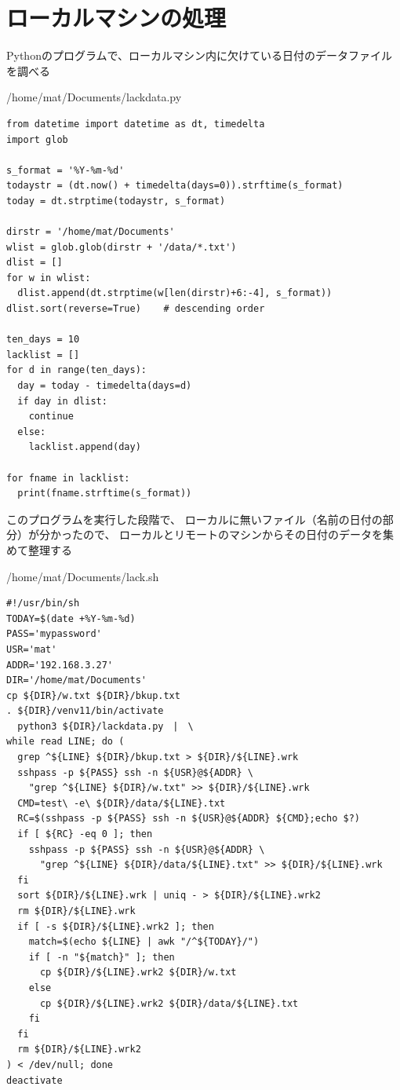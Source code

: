 \documentclass[12pt,a4j]{jsbook}
\begin{document}
\newpage

\section{ローカルマシンの処理}

Pythonのプログラムで、ローカルマシン内に欠けている日付のデータファイルを調べる

\begin{spacing}{0.95}
\begin{itembox}[l]{/home/mat/Documents/lackdata.py}
\begin{verbatim}
from datetime import datetime as dt, timedelta
import glob

s_format = '%Y-%m-%d'
todaystr = (dt.now() + timedelta(days=0)).strftime(s_format)
today = dt.strptime(todaystr, s_format)

dirstr = '/home/mat/Documents'
wlist = glob.glob(dirstr + '/data/*.txt')
dlist = []
for w in wlist:
  dlist.append(dt.strptime(w[len(dirstr)+6:-4], s_format))
dlist.sort(reverse=True)	# descending order

ten_days = 10
lacklist = []
for d in range(ten_days):
  day = today - timedelta(days=d)
  if day in dlist:
    continue
  else:
    lacklist.append(day)

for fname in lacklist:
  print(fname.strftime(s_format))
\end{verbatim}
\end{itembox}
\end{spacing}

このプログラムを実行した段階で、
ローカルに無いファイル（名前の日付の部分）が分かったので、
ローカルとリモートのマシンからその日付のデータを集めて整理する
\begin{spacing}{0.95}
\begin{itembox}[l]{/home/mat/Documents/lack.sh}
\begin{verbatim}
#!/usr/bin/sh
TODAY=$(date +%Y-%m-%d)
PASS='mypassword'
USR='mat'
ADDR='192.168.3.27'
DIR='/home/mat/Documents'
cp ${DIR}/w.txt ${DIR}/bkup.txt
. ${DIR}/venv11/bin/activate
  python3 ${DIR}/lackdata.py　|　\
while read LINE; do (
  grep ^${LINE} ${DIR}/bkup.txt > ${DIR}/${LINE}.wrk
  sshpass -p ${PASS} ssh -n ${USR}@${ADDR} \
    "grep ^${LINE} ${DIR}/w.txt" >> ${DIR}/${LINE}.wrk
  CMD=test\ -e\ ${DIR}/data/${LINE}.txt
  RC=$(sshpass -p ${PASS} ssh -n ${USR}@${ADDR} ${CMD};echo $?)
  if [ ${RC} -eq 0 ]; then
    sshpass -p ${PASS} ssh -n ${USR}@${ADDR} \
      "grep ^${LINE} ${DIR}/data/${LINE}.txt" >> ${DIR}/${LINE}.wrk
  fi
  sort ${DIR}/${LINE}.wrk | uniq - > ${DIR}/${LINE}.wrk2
  rm ${DIR}/${LINE}.wrk
  if [ -s ${DIR}/${LINE}.wrk2 ]; then
    match=$(echo ${LINE} | awk "/^${TODAY}/")
    if [ -n "${match}" ]; then
      cp ${DIR}/${LINE}.wrk2 ${DIR}/w.txt
    else
      cp ${DIR}/${LINE}.wrk2 ${DIR}/data/${LINE}.txt
    fi
  fi
  rm ${DIR}/${LINE}.wrk2
) < /dev/null; done
deactivate
\end{verbatim}
\end{itembox}
\end{spacing}
\end{document}

